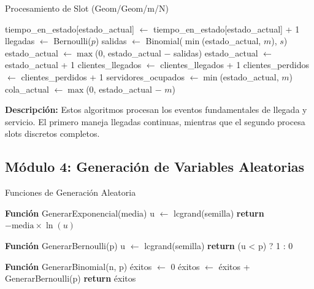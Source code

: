 \documentclass{article}
\begin{document}
\begin{algorithm}[H]
\caption{Procesamiento de Slot (Geom/Geom/m/N)}
\begin{algorithmic}[1]
\STATE tiempo\_en\_estado[estado\_actual] $\gets$ tiempo\_en\_estado[estado\_actual] + 1
\STATE llegadas $\gets$ Bernoulli($p$)
\STATE salidas $\gets$ Binomial($\min$(estado\_actual, $m$), $s$)
\STATE estado\_actual $\gets \max$(0, estado\_actual $-$ salidas)
        \STATE estado\_actual $\gets$ estado\_actual + 1
        \STATE clientes\_llegados $\gets$ clientes\_llegados + 1
    \ELSE
        \STATE clientes\_perdidos $\gets$ clientes\_perdidos + 1
    \ENDIF
\ENDIF
\STATE servidores\_ocupados $\gets \min$(estado\_actual, $m$)
\STATE cola\_actual $\gets \max$(0, estado\_actual $-$ $m$)
\end{algorithmic}
\end{algorithm}

\textbf{Descripción:} Estos algoritmos procesan los eventos fundamentales de llegada y servicio. El primero maneja llegadas continuas, mientras que el segundo procesa slots discretos completos.

\subsection{Módulo 4: Generación de Variables Aleatorias}

\begin{algorithm}[H]
\caption{Funciones de Generación Aleatoria}
\begin{algorithmic}[1]
    \STATE \textbf{Función} GenerarExponencial(media)
    \STATE \hspace{1em} u $\gets$ lcgrand(semilla)
    \STATE \hspace{1em} \textbf{return} $-\text{media} \times \ln(u)$

    \STATE \textbf{Función} GenerarBernoulli(p)
    \STATE \hspace{1em} u $\gets$ lcgrand(semilla)
    \STATE \hspace{1em} \textbf{return} (u < p) ? 1 : 0

    \STATE \textbf{Función} GenerarBinomial(n, p)
    \STATE \hspace{1em} éxitos $\gets$ 0
        \STATE \hspace{2em} éxitos $\gets$ éxitos + GenerarBernoulli(p)
    \ENDFOR
    \STATE \hspace{1em} \textbf{return} éxitos
\end{algorithmic}
\end{algorithm}
\end{document}
